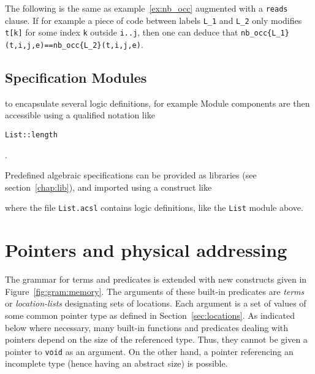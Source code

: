 \begin{example}
  The following is the same as example~\ref{ex:nb_occ} augmented with
  a \lstinline|reads| clause.
  If for example a
  piece of code between labels \lstinline|L_1| and \lstinline|L_2|
  only modifies \lstinline|t[k]| for
  some index \lstinline|k| outside \lstinline|i..j|, then one can deduce that
  \lstinline|nb_occ{L_1}(t,i,j,e)==nb_occ{L_2}(t,i,j,e)|.
\end{example}

\subsection{Specification Modules}
\label{sec:specmodules}

\experimental


 to encapsulate
several logic definitions, for example
Module components are then accessible using a qualified notation like
\begin{notimplementedenv}\lstinline|List::length|\end{notimplementedenv}.


Predefined algebraic specifications can be provided as
libraries (see
section~\ref{chap:lib}), and imported using a construct like
\begin{notimplementedenv}
\end{notimplementedenv}
where the file \lstinline|List.acsl| contains logic
definitions, like the \lstinline|List| module above.




\section{Pointers and physical addressing}
\label{sec:pointers} 
The grammar for terms and predicates is
extended with new constructs given in Figure~\ref{fig:gram:memory}. 
The arguments of these built-in predicates are \textsl{terms} or \textsl{location-lists} designating sets of locations.
Each argument is a set of values of some common pointer type as defined in Section~\ref{sec:locations}. As indicated below where necessary,
many built-in functions and predicates dealing with
pointers depend on the size of the referenced type. Thus, they cannot be given
a pointer to \lstinline|void| as an argument. On the
other hand, a pointer referencing an incomplete type (hence having an
abstract size) is possible.

